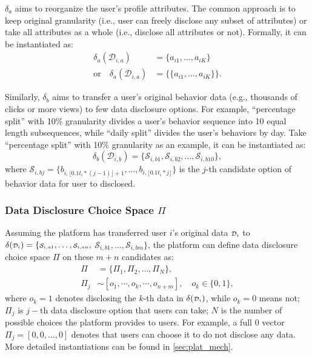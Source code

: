 $\delta_a$ aims to reorganize the user’s profile attributes.
The common approach is to keep original granularity (i.e., user can freely disclose any subset of attributes) or take all attributes as a whole (i.e., disclose all attributes or not).
Formally, it can be instantiated as:
\begin{equation*}
    \begin{aligned}
     \delta_a ({\scriptstyle \mathcal{D}_{i,a}}) &= \{a_{i1},\dots, a_{iK}\}\\
    \text{or}\quad  \delta_a ({\scriptstyle \mathcal{D}_{i,a}}) &= \{\{a_{i1},\dots, a_{iK}\}\}.
    \end{aligned}
\end{equation*}

Similarly, $\delta_b$ aims to transfer a user's original behavior data (e.g., thousands of clicks or more views) to few data disclosure options.
For example, ``percentage split'' with 10\% granularity divides a user's behavior sequence into 10 equal length subsequences, while ``daily split'' divides the user's behaviors by day.
Take ``percentage split'' with 10\% granularity as an example, it can be instantiated as: 
\begin{equation*}
    \delta_b ({\scriptstyle \mathcal{D}_{i,b}}) = \{{\scriptstyle \mathcal{S}_{i,b1}}, {\scriptstyle \mathcal{S}_{i,b2}}, \dots, {\scriptstyle \mathcal{S}_{i,b10}} \},
\end{equation*}
where ${\scriptstyle \mathcal{S}_{i,bj}} = \{b_{i,\lfloor 0.1 t_i*(j-1)\rfloor+1}, \dots, b_{i, \lfloor 0.1 t_i*j\rfloor}\}$ is the $j$-th candidate option of behavior data for user to disclosed.

\subsubsection{\textbf{Data Disclosure Choice Space $\Pi$}}

Assuming the platform has transferred user $i$'s original data ${\scriptstyle \mathcal{D}_i}$ to $\delta({\scriptstyle \mathcal{D}_i}) = \{{\scriptstyle \mathcal{S}_{i,a1}},\dots,{\scriptstyle \mathcal{S}_{i,an}},$ $ {\scriptstyle \mathcal{S}_{i,b1}}, \dots,{\scriptstyle \mathcal{S}_{i,bm}}\}$, the platform can define data disclosure choice space $\Pi$ on these $m+n$ candidates as:
\begin{equation*}
    \begin{aligned}
    \Pi &= \{\Pi_1,\Pi_2, \dots, \Pi_N\}, \\
    \Pi_j & \sim [o_1, \cdots, o_k, \cdots, o_{n+m}], \quad o_k \in \{0,1\},
    \end{aligned}
\end{equation*}
where $o_k = 1$ denotes disclosing the $k$-th data in $\delta({\scriptstyle \mathcal{D}_i})$, while $o_k = 0$ means not; $\Pi_j$ is $j-$th data disclosure option that users can take; $N$ is the number of possible choices the platform provides to users.
For example, a full 0 vector $\Pi_j = [0, 0, \dots, 0]$ denotes that users can choose it to do not disclose any data.
More detailed instantiations can be found in \cref{sec:plat_mech}.



